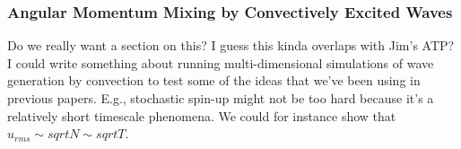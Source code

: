 {\color{purple}
\subsubsection{Angular Momentum Mixing by Convectively Excited Waves}}

Do we really want a section on this?  I guess this kinda overlaps with Jim's ATP?  I could write something about running multi-dimensional simulations of wave generation by convection to test some of the ideas that we've been using in previous papers.  E.g., stochastic spin-up might not be too hard because it's a relatively short timescale phenomena. We could for instance show that $u_{rms} \sim sqrt{N} \sim sqrt{T}$.
